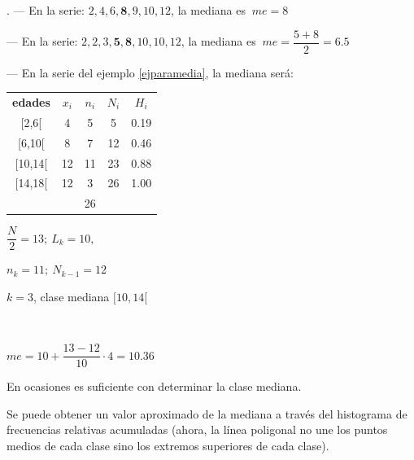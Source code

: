 \begin{example}
. --- En la serie: $2,4,6,\boldsymbol{8},9,10,12$, la mediana es $\ me=8$

\vspace{2mm} --- En la serie: $2,2,3,\boldsymbol{5}, \boldsymbol{8}, 10, 10, 12$, la mediana es $\ me=\dfrac{5+8}{2}=6.5$

\vspace{2mm} --- En la serie del ejemplo \ref{ejparamedia}, la mediana será:

\begin{multicols}{2}
\begin{table}[H]
\small
\centering
\begin{tabular}{cc|c|cc}
\cline{1-4}
\multicolumn{1}{|c|}{\textbf{edades}} & \textbf{$x_i$} & \textbf{$n_i$} & \multicolumn{1}{c|}{\textbf{$N_i$}} & \textcolor{gris}{$H_i$} \\ \cline{1-4}
\multicolumn{1}{c|}{[2,6[}            & 4              & 5              & 5                                   & \textcolor{gris}{0.19}  \\
\multicolumn{1}{c|}{[6,10[}           & 8              & 7              & 12                                  & \textcolor{gris}{0.46}  \\
\multicolumn{1}{c|}{[10,14[}          & 12             & 11             & 23                                  & \textcolor{gris}{0.88}  \\
\multicolumn{1}{c|}{[14,18[}          & 12             & 3              & 26                                  & \textcolor{gris}{1.00}  \\ \cline{3-3}
                                      &                & 26             &                                     &       \\ \cline{3-3}
\end{tabular}
\end{table}
$\dfrac N 2=13; \ L_k=10,$

$n_k=11; \ N_{k-1}=12$

$k=3$,  clase mediana $[10,14[$

$\quad$

$me=10+\dfrac{13-12}{10}\cdot 4=10.36$

\end{multicols}
En ocasiones es suficiente con determinar la clase mediana.
\end{example}

Se puede obtener un valor aproximado de la mediana a través del histograma de frecuencias relativas acumuladas \textcolor{gris}{(ahora, la línea poligonal no une los puntos medios de cada clase sino los extremos superiores de cada clase)}.

